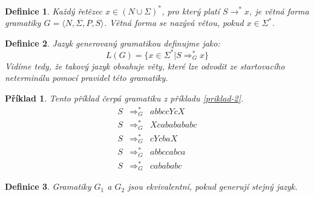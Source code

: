 \documentclass[10pt,a4paper]{article}
\theoremstyle{note}
\newtheorem{definice}{Definice}
\newtheorem{priklad}{Příklad}
\begin{document}
\begin{definice}
Každý řetězec $x \in (N \cup\Sigma)^{*}$, pro který platí $S \rightarrow^{*} x$, je \textit{větná forma} gramatiky $G = \langle N, \Sigma, P, S \rangle$.
Větná forma se nazývá \textit{větou}, pokud $x \in \Sigma^{*}$.
\end{definice}

\begin{definice}
Jazyk generovaný gramatikou definujme jako:
$$
L(G) = \lbrace x \in \Sigma^{*} | S \Rightarrow_{G}^{*} x \rbrace
$$
Vidíme tedy, že takový jazyk obsahuje \textit{věty}, které lze odvodit ze startovacího neterminálu pomocí pravidel této gramatiky.
\end{definice}

\begin{priklad}
Tento příklad čerpá gramatiku z příkladu \ref{priklad-2}.
\begin{eqnarray*}
S &\Rightarrow_{G}^{*}& abbccYcX \\
S &\Rightarrow_{G}^{*}& Xcababababc \\
S &\Rightarrow_{G}^{*}& cYcbaX \\
S &\Rightarrow_{G}^{*}& abbccabca \\
S &\Rightarrow_{G}^{*}& cabababc
\end{eqnarray*}
\end{priklad}

\begin{definice}
Gramatiky $G_{1}$ a $G_{2}$ jsou \textit{ekvivalentní}, pokud generují stejný jazyk.
\end{definice}
\end{document}
